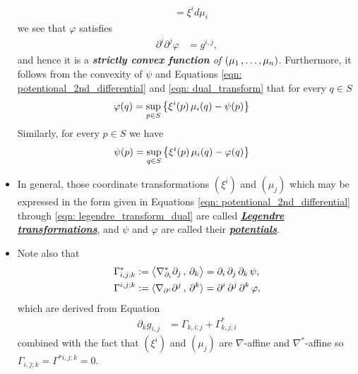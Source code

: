 \documentclass[11pt]{article}
\begin{document}
\begin{itemize}
\begin{align*}
 &= \xi^i d\mu_i
\end{align*} we see that $\varphi$ satisfies
\begin{align}
\partial^i\partial^j \varphi &= g^{i,j},  \label{eqn: dual_potentional_2nd_differential}
\end{align} and hence it is a \emph{\textbf{strictly convex function} of $(\mu_1 \,{,}\ldots{,}\, \mu_n)$}.  Furthermore, it follows
from the convexity of $\psi$ and Equations \eqref{eqn: potentional_2nd_differential} and \eqref{eqn: dual_transform} that for every $q \in S$
\begin{align}
\varphi(q) &= \sup_{p \in S}\left\{\xi^{i}(p)\,\mu_i(q) - \psi(p)\right\}  \label{eqn: legendre_transform}
\end{align} Similarly, for every $p \in S$ we have
\begin{align}
\psi(p) &= \sup_{q \in S}\left\{\xi^{i}(p)\,\mu_i(q) - \varphi(q)\right\}  \label{eqn: legendre_transform_dual}
\end{align}

\item \begin{definition}
In general, those coordinate transformations $(\xi^i)$ and $(\mu_j)$ which may be expressed in the form given in Equations \eqref{eqn: potentional_2nd_differential} through \eqref{eqn: legendre_transform_dual} are called \underline{\emph{\textbf{Legendre transformations}}}, and $\psi$ and $\varphi$ are called their \underline{\emph{\textbf{potentials}}}. 
\end{definition}

\item Note also that
\begin{align}
\Gamma^{*}_{i,j;k} &:= \left\langle \nabla^{*}_{\partial_i}{\partial_j}\,,\, \partial_k \right\rangle = \partial_i\,\partial_j\,\partial_k\,\psi, \label{eqn: dual_connection_with_partion_function}\\
\Gamma^{i,j;k} &:= \langle{\nabla_{\partial^i}{\partial^j}\,,\,\partial^k}\rangle = \partial^i\,\partial^j\,\partial^k\,\varphi, \label{eqn: connection_with_dual_partion_function}
\end{align}
which are derived from Equation 
\begin{align*}
\partial_k g_{i,j} &= \Gamma_{k,i;j} + \Gamma^{*}_{k,j;i}
\end{align*}
combined with the fact that $(\xi^i)$ and $(\mu_j)$ are $\nabla$-affine and $\nabla^{*}$-affine so $\Gamma_{i,j;k} = \Gamma^{*i,j;k} = 0$.


\end{itemize}
\end{document}
